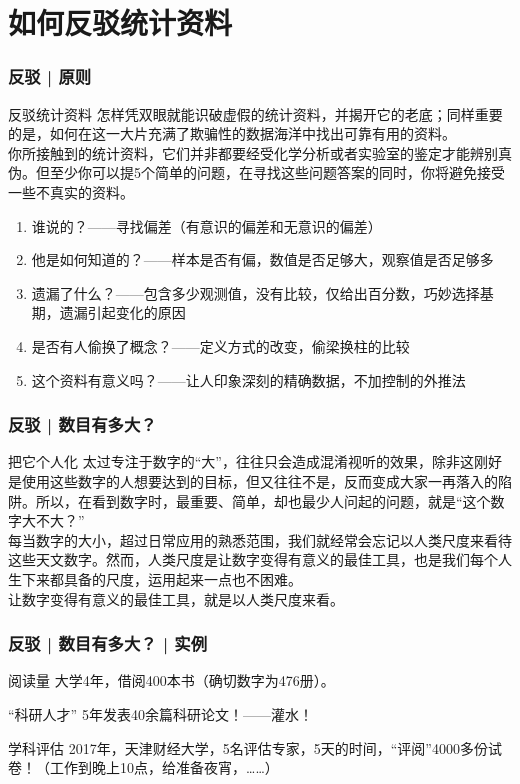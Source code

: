 \section{如何反驳统计资料}
\begin{frame}
  \frametitle{反驳 | 原则}
  \begin{block}{\alert{反驳统计资料}}
    怎样凭双眼就能识破虚假的统计资料，并揭开它的老底；同样重要的是，如何在这一大片充满了欺骗性的数据海洋中找出可靠有用的资料。\\
    \vspace{0.5em}
    你所接触到的统计资料，它们并非都要经受化学分析或者实验室的鉴定才能辨别真伪。但至少你可以提5个简单的问题，在寻找这些问题答案的同时，你将避免接受一些不真实的资料。
    \begin{enumerate}
      \item 谁说的？——寻找偏差（有意识的偏差和无意识的偏差）
      \item 他是如何知道的？——样本是否有偏，数值是否足够大，观察值是否足够多
      \item 遗漏了什么？——包含多少观测值，没有比较，仅给出百分数，巧妙选择基期，遗漏引起变化的原因
      \item 是否有人偷换了概念？——定义方式的改变，偷梁换柱的比较
      \item 这个资料有意义吗？——让人印象深刻的精确数据，不加控制的外推法
    \end{enumerate}
  \end{block}
\end{frame}

\begin{frame}
  \frametitle{反驳 | 数目有多大？}
  \begin{block}{把它个人化}
  太过专注于数字的“大”，往往只会造成混淆视听的效果，除非这刚好是使用这些数字的人想要达到的目标，但又往往不是，反而变成大家一再落入的陷阱。所以，在看到数字时，最重要、简单，却也最少人问起的问题，就是“这个数字大不大？”\\
  \vspace{0.5em}
  每当数字的大小，超过日常应用的熟悉范围，我们就经常会忘记以人类尺度来看待这些天文数字。然而，\alert{人类尺度是让数字变得有意义的最佳工具}，也是我们每个人生下来都具备的尺度，运用起来一点也不困难。\\
  \vspace{0.5em}
  \alert{让数字变得有意义的最佳工具，就是以人类尺度来看。}
  \end{block}
\end{frame}

\begin{frame}
  \frametitle{反驳 | 数目有多大？ | 实例}
  \begin{block}{阅读量}
    大学4年，借阅400本书（确切数字为476册）。
  \end{block}
  \pause
  \begin{block}{“科研人才”}
    5年发表40余篇科研论文！——灌水！
  \end{block}
  \pause
  \begin{block}{学科评估}
    2017年，天津财经大学，5名评估专家，5天的时间，“评阅”4000多份试卷！（工作到晚上10点，给准备夜宵，……）
  \end{block}
\end{frame}

